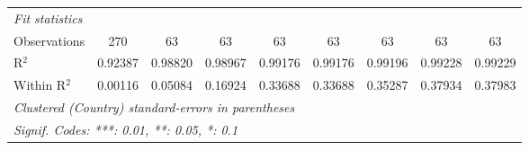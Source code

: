 \begin{table}[htbp]
\begin{tabular}{lcccccccc}
      \midrule
      \emph{Fit statistics}\\
      Observations                                                           & 270      & 63       & 63             & 63              & 63                    & 63              & 63                   & 63\\  
      R$^2$                                                                  & 0.92387  & 0.98820  & 0.98967        & 0.99176         & 0.99176               & 0.99196         & 0.99228              & 0.99229\\  
      Within R$^2$                                                           & 0.00116  & 0.05084  & 0.16924        & 0.33688         & 0.33688               & 0.35287         & 0.37934              & 0.37983\\  
      \midrule \midrule
      \multicolumn{9}{l}{\emph{Clustered (Country) standard-errors in parentheses}}\\
      \multicolumn{9}{l}{\emph{Signif. Codes: ***: 0.01, **: 0.05, *: 0.1}}\\
   \end{tabular}
\end{table}


